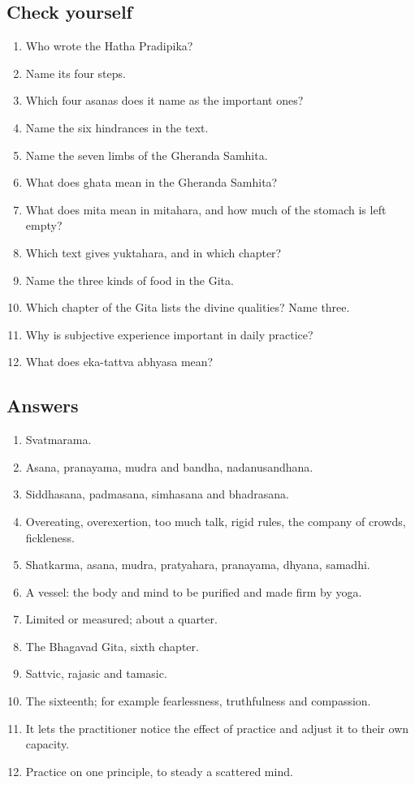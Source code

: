 \subsection*{Check yourself}
\begin{enumerate}
\item Who wrote the Hatha Pradipika?
\item Name its four steps.
\item Which four asanas does it name as the important ones?
\item Name the six hindrances in the text.
\item Name the seven limbs of the Gheranda Samhita.
\item What does ghata mean in the Gheranda Samhita?
\item What does mita mean in mitahara, and how much of the stomach is left empty?
\item Which text gives yuktahara, and in which chapter?
\item Name the three kinds of food in the Gita.
\item Which chapter of the Gita lists the divine qualities? Name three.
\item Why is subjective experience important in daily practice?
\item What does eka-tattva abhyasa mean?
\end{enumerate}

\subsection*{Answers}
\begin{enumerate}
\item Svatmarama.
\item Asana, pranayama, mudra and bandha, nadanusandhana.
\item Siddhasana, padmasana, simhasana and bhadrasana.
\item Overeating, overexertion, too much talk, rigid rules, the company of crowds, fickleness.
\item Shatkarma, asana, mudra, pratyahara, pranayama, dhyana, samadhi.
\item A vessel: the body and mind to be purified and made firm by yoga.
\item Limited or measured; about a quarter.
\item The Bhagavad Gita, sixth chapter.
\item Sattvic, rajasic and tamasic.
\item The sixteenth; for example fearlessness, truthfulness and compassion.
\item It lets the practitioner notice the effect of practice and adjust it to their own capacity.
\item Practice on one principle, to steady a scattered mind.
\end{enumerate}

